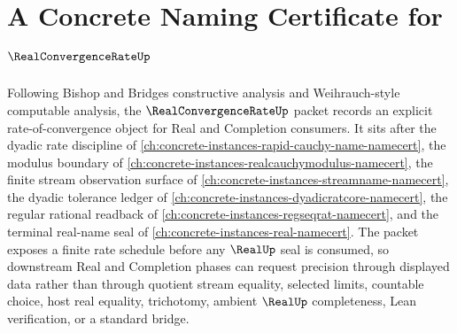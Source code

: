 \chapter{A Concrete Naming Certificate for $\RealConvergenceRateUp$}
\label{ch:concrete-instances-real-convergence-rate-namecert}

Following Bishop and Bridges constructive analysis and Weihrauch-style computable analysis, the $\RealConvergenceRateUp$ packet records an explicit rate-of-convergence object for Real and Completion consumers. It sits after the dyadic rate discipline of \autoref{ch:concrete-instances-rapid-cauchy-name-namecert}, the modulus boundary of \autoref{ch:concrete-instances-realcauchymodulus-namecert}, the finite stream observation surface of \autoref{ch:concrete-instances-streamname-namecert}, the dyadic tolerance ledger of \autoref{ch:concrete-instances-dyadicratcore-namecert}, the regular rational readback of \autoref{ch:concrete-instances-regseqrat-namecert}, and the terminal real-name seal of \autoref{ch:concrete-instances-real-namecert}. The packet exposes a finite rate schedule before any $\RealUp$ seal is consumed, so downstream Real and Completion phases can request precision through displayed data rather than through quotient stream equality, selected limits, countable choice, host real equality, trichotomy, ambient $\RealUp$ completeness, Lean verification, or a standard bridge.

